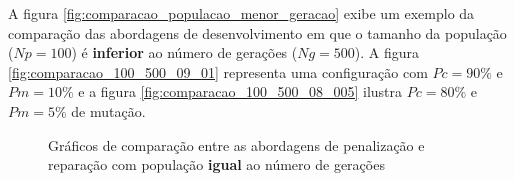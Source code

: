 \documentclass[11pt]{article}
\begin{document}
A figura \ref{fig:comparacao_populacao_menor_geracao} exibe um exemplo da comparação das abordagens de desenvolvimento em que o tamanho da população  ($Np = 100$) é \textbf{inferior} ao número de gerações ($Ng = 500$). A figura \ref{fig:comparacao_100_500_09_01} representa uma configuração com $Pc = 90\%$ e $Pm = 10\% $ e a figura \ref{fig:comparacao_100_500_08_005} ilustra $Pc = 80\%$ e $ Pm = 5\%$ de mutação.

\begin{figure}[!htb]
	\centering
	\quad %
	\caption{Gráficos de comparação entre as abordagens de penalização e reparação com população \textbf{igual} ao número de gerações}
	\label{fig:comparacao_populacao_igual_geracao}
\end{figure}
\end{document}

